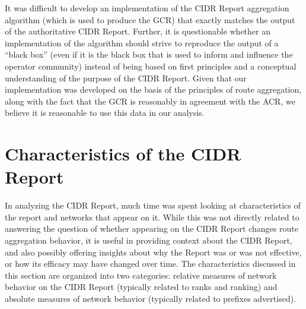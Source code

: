 %

It was difficult to develop an implementation of the CIDR Report aggregation
algorithm (which is used to produce the GCR) that exactly matches the output of
the authoritative CIDR Report. Further, it is questionable whether an
implementation of the algorithm should strive to reproduce the output of a
``black box'' (even if it is the black box that is used to inform and influence
the operator community) instead of being based on first principles and a
conceptual understanding of the purpose of the CIDR Report. Given that our
implementation was developed on the basis of the principles of route
aggregation, along with the fact that the GCR is reasonably in agreement with
the ACR, we believe it is reasonable to use this data in our analysis.

\section{Characteristics of the CIDR Report}

In analyzing the CIDR Report, much time was spent looking at characteristics of
the report and networks that appear on it. While this was not directly related
to answering the question of whether appearing on the CIDR Report changes route
aggregation behavior, it is useful in providing context about the CIDR Report,
and also possibly offering insights about why the Report was or was not
effective, or how its efficacy may have changed over time. The characteristics
discussed in this section are organized into two categories: relative measures
of network behavior on the CIDR Report (typically related to ranks and ranking)
and absolute measures of network behavior (typically related to prefixes
advertised).

